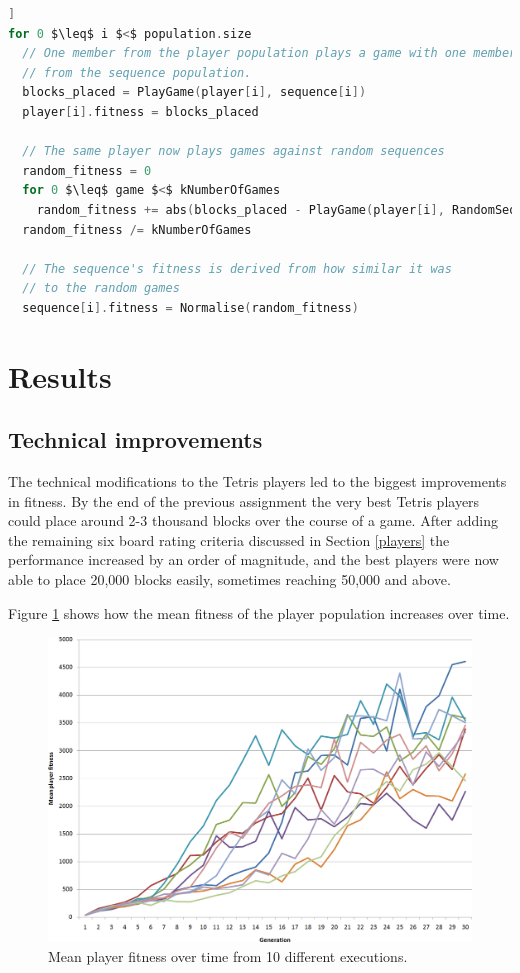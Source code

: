 \documentclass[a4paper,11pt]{article}
\begin{document}
\begin{lstlisting}[firstnumber=1,language=c,morekeywords={until,foreach,in},frame=single,mathescape=true,caption={Pseudo-code of the algorithm used to evolve one generation},label={psuedocode},float=[htb]]
for 0 $\leq$ i $<$ population.size
  // One member from the player population plays a game with one member
  // from the sequence population.
  blocks_placed = PlayGame(player[i], sequence[i])
  player[i].fitness = blocks_placed
  
  // The same player now plays games against random sequences
  random_fitness = 0
  for 0 $\leq$ game $<$ kNumberOfGames
    random_fitness += abs(blocks_placed - PlayGame(player[i], RandomSequence()))
  random_fitness /= kNumberOfGames
  
  // The sequence's fitness is derived from how similar it was
  // to the random games
  sequence[i].fitness = Normalise(random_fitness)
\end{lstlisting}

\section{Results}

\subsection{Technical improvements}

The technical modifications to the Tetris players led to the biggest
improvements in fitness.
By the end of the previous assignment the very best Tetris players could place
around 2-3 thousand blocks over the course of a game.
After adding the remaining six board rating criteria discussed in Section
\ref{players} the performance increased by an order of magnitude, and the best
players were now able to place 20,000 blocks easily, sometimes reaching 50,000
and above.

Figure \ref{LinearNoCoev} shows how the mean fitness of the player population
increases over time.

\begin{figure}[h]
  \label{LinearNoCoev}
  \centering
  \includegraphics[width=13cm]{results/linear-no-coev.png}
  \caption{Mean player fitness over time from 10 different executions.}
\end{figure}
\end{document}
